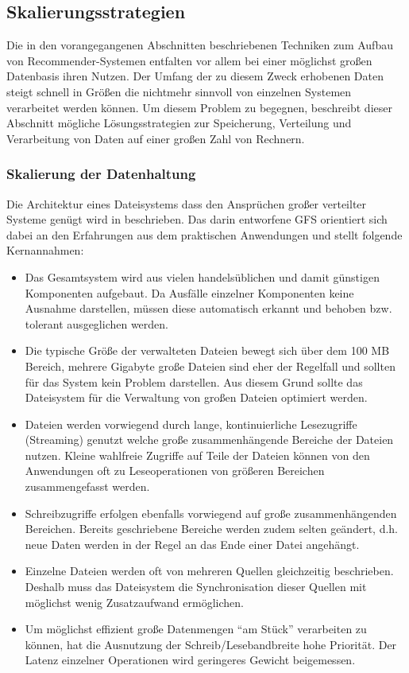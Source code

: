 \subsection{Skalierungsstrategien}
\label{sec:scale}

Die in den vorangegangenen Abschnitten beschriebenen Techniken zum Aufbau von Recommender-Systemen entfalten vor allem bei einer möglichst großen Datenbasis ihren Nutzen. Der Umfang der zu diesem Zweck erhobenen Daten steigt schnell in Größen die nichtmehr sinnvoll von einzelnen Systemen verarbeitet werden können.  Um  diesem Problem zu begegnen, beschreibt dieser Abschnitt mögliche Lösungsstrategien zur Speicherung, Verteilung und Verarbeitung von Daten auf einer großen Zahl von Rechnern. 

\subsubsection{Skalierung der Datenhaltung}

Die Architektur eines Dateisystems dass den Ansprüchen großer verteilter Systeme genügt wird in \citep{ghemawat03} beschrieben. Das darin entworfene \acf{GFS} orientiert sich dabei an den Erfahrungen aus dem praktischen Anwendungen und stellt folgende Kernannahmen:

\begin{itemize}
\item Das Gesamtsystem wird aus vielen handelsüblichen und damit günstigen Komponenten aufgebaut. Da Ausfälle einzelner Komponenten keine Ausnahme darstellen, müssen diese automatisch erkannt und behoben bzw. tolerant ausgeglichen werden.
\item Die typische Größe der verwalteten Dateien bewegt sich über dem 100 MB Bereich, mehrere Gigabyte große Dateien sind eher der Regelfall und sollten für das System kein Problem darstellen. Aus diesem Grund sollte das Dateisystem für die Verwaltung von großen Dateien optimiert werden. 
\item Dateien werden vorwiegend durch lange, kontinuierliche Lesezugriffe (Streaming) genutzt welche große zusammenhängende Bereiche der Dateien nutzen. Kleine wahlfreie Zugriffe auf Teile der Dateien können von den Anwendungen oft zu Leseoperationen von größeren Bereichen zusammengefasst werden.
\item Schreibzugriffe erfolgen ebenfalls vorwiegend auf große zusammenhängenden Bereichen. Bereits geschriebene Bereiche werden zudem selten geändert, d.h. neue Daten werden in der Regel an das Ende einer Datei angehängt.
\item Einzelne Dateien werden oft von mehreren Quellen gleichzeitig beschrieben. Deshalb muss das Dateisystem die Synchronisation dieser Quellen mit möglichst wenig Zusatzaufwand ermöglichen.
\item Um möglichst effizient große Datenmengen ``am Stück'' verarbeiten zu können, hat die Ausnutzung der Schreib/Lesebandbreite hohe Priorität. Der Latenz einzelner Operationen wird geringeres Gewicht beigemessen.
\end{itemize}

